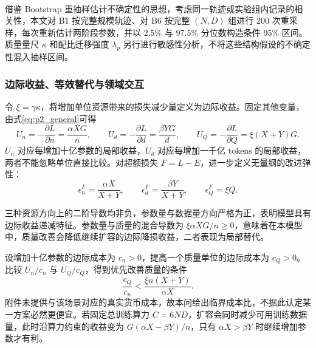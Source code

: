 \documentclass[bwprint]{gmcmthesis}
\numberwithin{equation}{section}
\numberwithin{figure}{section}
\numberwithin{table}{section}
\begin{document}
        借鉴 Bootstrap 重抽样估计不确定性的思想\textsuperscript{\cite{efron1979bootstrap}}，考虑同一轨迹或实验组内记录的相关性，本文对 B1 按完整规模轨迹、对 B6 按完整 $(N,D)$ 组进行 200 次重采样，每次重新估计两阶段参数，并以 2.5\% 与 97.5\% 分位数构造条件 95\% 区间。质量量尺 $\kappa$ 和配比迁移强度 $\lambda_p$ 另行进行敏感性分析，不将这些结构假设的不确定性混入抽样区间。
    
        \subsubsection{边际收益、等效替代与领域交互}
        令 $\xi=\gamma\kappa$，将增加单位资源带来的损失减少量定义为边际收益。固定其他变量，由式\eqref{eq:p2_general}可得
        \begin{equation}
         U_n=-\frac{\partial L}{\partial n}=\frac{\alpha XG}{n},\qquad
         U_d=-\frac{\partial L}{\partial d}=\frac{\beta YG}{d},\qquad
         U_Q=-\frac{\partial L}{\partial Q}=\xi(X+Y)G.
         \label{eq:p2_marginal}
        \end{equation}
        $U_n$ 对应每增加十亿参数的局部收益，$U_d$ 对应每增加一千亿 tokens 的局部收益，两者不能忽略单位直接比较。对超额损失 $F=L-E$，进一步定义无量纲的改进弹性：
        \begin{equation}
         \epsilon_n^F=\frac{\alpha X}{X+Y},\qquad
         \epsilon_d^F=\frac{\beta Y}{X+Y},\qquad
         \epsilon_Q^F=\xi Q.
         \label{eq:p2_elasticity}
        \end{equation}
        
        
        三种资源方向上的二阶导数均非负，参数量与数据量方向严格为正，表明模型具有边际收益递减特征。参数量与质量的混合导数为 $\xi\alpha XG/n\geq0$，意味着在本模型中，质量改善会降低继续扩容的边际降损收益，二者表现为局部替代。
        
        设增加十亿参数的边际成本为 $c_n>0$，提高一个质量单位的边际成本为 $c_Q>0$。比较 $U_n/c_n$ 与 $U_Q/c_Q$，得到优先改善质量的条件
        \begin{equation}
         \frac{c_Q}{c_n}<\frac{\xi n(X+Y)}{\alpha X}.
         \label{eq:p2_cost}
        \end{equation}
        附件未提供与该场景对应的真实货币成本，故本问给出临界成本比，不据此认定某一方案必然更便宜。若固定总训练算力 $C=6ND$，扩容会同时减少可用训练数据量，此时沿算力约束的收益变为 $G(\alpha X-\beta Y)/n$，只有 $\alpha X>\beta Y$ 时继续增加参数才有利。
    
\end{document}
